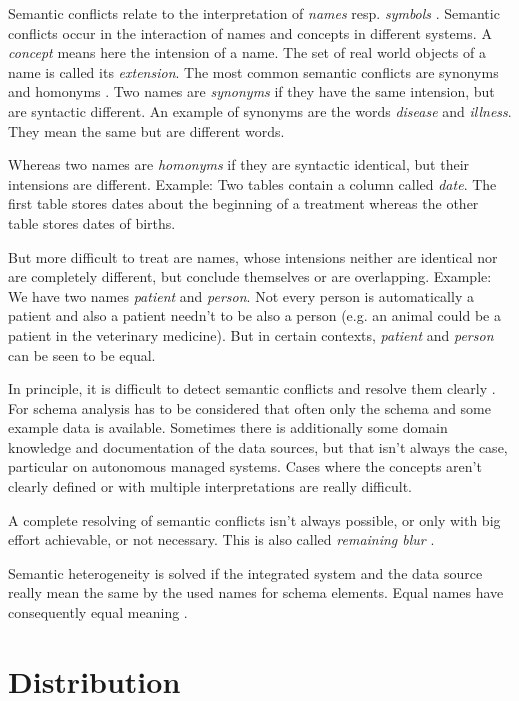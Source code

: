 Semantic conflicts relate to the interpretation of \emph{names} resp. \emph{symbols} \cite[p. 74]{DBLP:books/dp/LeserN2006}. 
Semantic conflicts occur in the interaction of names and concepts in different systems. 
A \textit{concept} means here the intension of a name. The set of real world objects of a name is called its \emph{extension}. 
The most common semantic conflicts are synonyms and homonyms \cite[p. 75]{DBLP:books/dp/LeserN2006}. 
Two names are \textit{synonyms} if they have the same intension, but are syntactic different. An example of synonyms are the words \emph{disease} and \emph{illness}. They mean the same but are different words.

Whereas two names are \textit{homonyms} if they are syntactic identical, but their intensions are different. Example: Two tables contain a column called \emph{date}. The first table stores dates about the beginning of a treatment whereas the other table stores dates of births.

But more difficult to treat are names, whose intensions neither are identical nor are completely different, but conclude themselves or are overlapping. Example: We have two names \emph{patient} and \emph{person}. Not every person is automatically a patient and also a patient needn't to be also a person (e.g. an animal could be a patient in the veterinary medicine). But in certain contexts, \emph{patient} and \emph{person} can be seen to be equal.

In principle, it is difficult to detect semantic conflicts and resolve them clearly \cite[p. 76]{DBLP:books/dp/LeserN2006}. 
For schema analysis has to be considered that often only the schema and some example data is available. Sometimes there is additionally some domain knowledge and documentation of the data sources, but that isn't always the case, particular on autonomous managed systems. Cases where the concepts aren't clearly defined or with multiple interpretations are really difficult. 

A complete resolving of semantic conflicts isn't always possible, or only with big effort achievable, or not necessary. This is also called \textit{remaining blur} \cite[p. 76]{DBLP:books/dp/LeserN2006}.

Semantic heterogeneity is solved if the integrated system and the data source really mean the same by the used names for schema elements. Equal names have consequently equal meaning \cite[p. 61]{DBLP:books/dp/LeserN2006}.

\section{Distribution}


